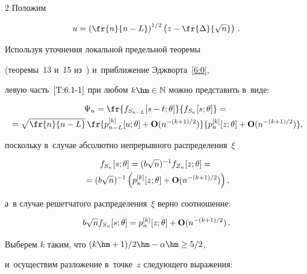 \begin{multicols}{2}
 Положим 


 $$


 u=\left(\fr{n}{n-L}\right)^{1/2}\left(z-\fr{\Delta}{\sqrt{n}}\right)\,.


 $$


 


 Используя уточнения локальной предельной тео\-ре\-мы 


 (тео\-ремы~13 и~15 из~\cite{10-ch}) и~приближение Эджворта~\eqref{6:0},


 левую часть~$\eqref{T:6.1-1}$ при любом $k\hm\in\mathbb{N}$ можно представить в~виде:


 \begin{multline}


\Psi_n=\fr{f_{S_{n-L}}[s-t;\theta]}{f_{S_n}[s;\theta]}={}\\


{}=


 \sqrt{\fr{n}{n-L}} \,


  \fr{p_{n-L}^{[k]}[u;\theta]  +\Op(n^{-(k+1)/2})}


  {p_{n}^{[k]}[z;\theta]+\Op(n^{-(k+1)/2})},


 \label{T:6.1-3}


 \end{multline}


 поскольку в~случае абсолютно непрерывного распределения~$\xi$


 \begin{multline*}


 f_{S_n}[s;\theta]=(b\sqrt{n})^{-1} f_{Z_n}[z;\theta]={}\\


 {}=


 (b\sqrt{n})^{-1}\left(p_{n}^{[k]}[z;\theta]+\Op(n^{-(k+1)/2})\right),


 \end{multline*}


 а~в случае решетчатого распределения~$\xi$ верно соотношение:


 \begin{equation*}


 b\sqrt{n}f_{S_n}[s;\theta]=p_{n}^{[k]}[z;\theta]+\Op(n^{-(k+1)/2})\,.


 \end{equation*}





   Выберем $k$ таким, что $(k\hm+1)/2\hm-\alpha\hm\ge 5/2$,


   и~осуществим разложение в~точке~$z$ следующего выражения:



\end{multicols}
